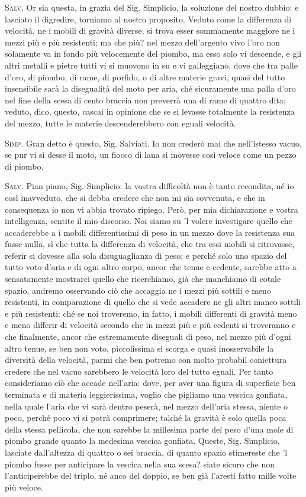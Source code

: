 \documentclass[11pt,twoside,openany]{book}
\newcommand{\speaker}[1]{\textcolor{rubric}{\textsc{#1}}\space}
\begin{document}
\speaker{Salv.} Or sia questa, in grazia del Sig. Simplicio, la soluzione del nostro dubbio: e lasciato il digredire, torniamo al nostro proposito. Veduto come la differenza di velocità, ne i mobili di gravità diverse, si trova esser sommamente maggiore ne i mezzi più e più resistenti; ma che più? nel mezzo dell'argento vivo l'oro non solamente va in fondo più velocemente del piombo, ma esso solo vi descende, e gli altri metalli e pietre tutti vi si muovono in su e vi galleggiano, dove che tra palle d'oro, di piombo, di rame, di porfido, o di altre materie gravi, quasi del tutto insensibile sarà la disegualità del moto per aria, ché sicuramente una palla d'oro nel fine della scesa di cento braccia non preverrà una di rame di quattro dita; veduto, dico, questo, cascai in opinione che se si levasse totalmente la resistenza del mezzo, tutte le materie descenderebbero con eguali velocità.

\speaker{Simp.} Gran detto è questo, Sig. Salviati. Io non crederò mai che nell'istesso vacuo, se pur vi si desse il moto, un fiocco di lana si movesse così veloce come un pezzo di piombo.

\speaker{Salv.} Pian piano, Sig. Simplicio: la vostra difficoltà non è tanto recondita, né io così inavveduto, che si debba credere che non mi sia sovvenuta, e che in consequenza io non vi abbia trovato ripiego. Però, per mia dichiarazione e vostra intelligenza, sentite il mio discorso. Noi siamo su 'l volere investigare quello che accaderebbe a i mobili differentissimi di peso in un mezzo dove la resistenza sua fusse nulla, sì che tutta la differenza di velocità, che tra essi mobili si ritrovasse, referir si dovesse alla sola disuguaglianza di peso; e perché solo uno spazio del tutto voto d'aria e di ogni altro corpo, ancor che tenue e cedente, sarebbe atto a sensatamente mostrarci quello che ricerchiamo, già che manchiamo di cotale spazio, andremo osservando ciò che accaggia ne i mezzi più sottili e meno resistenti, in comparazione di quello che si vede accadere ne gli altri manco sottili e più resistenti: ché se noi troveremo, in fatto, i mobili differenti di gravità meno e meno differir di velocità secondo che in mezzi più e più cedenti si troveranno e che finalmente, ancor che estremamente diseguali di peso, nel mezzo più d'ogni altro tenue, se ben non voto, piccolissima si scorga e quasi inosservabile la diversità della velocità, parmi che ben potremo con molto probabil coniettura credere che nel vacuo sarebbero le velocità loro del tutto eguali. Per tanto consideriamo ciò che accade nell'aria: dove, per aver una figura di superficie ben terminata e di materia leggierissima, voglio che pigliamo una vescica gonfiata, nella quale l'aria che vi sarà dentro peserà, nel mezzo dell'aria stessa, niente o poco, perché poco vi si potrà comprimere; talché la gravità è solo quella poca della stessa pellicola, che non sarebbe la millesima parte del peso d'una mole di piombo grande quanto la medesima vescica gonfiata. Queste, Sig. Simplicio, lasciate dall'altezza di quattro o sei braccia, di quanto spazio stimereste che 'l piombo fusse per anticipare la vescica nella sua scesa? siate sicuro che non l'anticiperebbe del triplo, né anco del doppio, se ben già l'aresti fatto mille volte più veloce.
\end{document}
